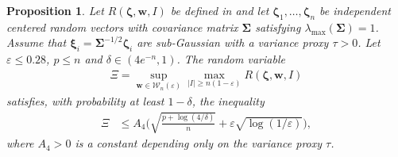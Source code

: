 \documentclass[aos,preprint,reqno]{imsart}
\newcommand\bxi{\boldsymbol\xi}
\newcommand\bzeta{\boldsymbol\zeta}
\newcommand\bSigma{\boldsymbol\Sigma}
\newcommand\bw{\boldsymbol w}
\theoremstyle{plain}
\newtheorem{proposition}{Proposition}
\theoremstyle{remark}
\begin{document}
    \begin{proposition}\label{proposition3}
	Let $R(\bzeta,\bw, I)$ be defined in  and 
	let $\bzeta_1,\ldots,\bzeta_n$ be independent centered random 
	vectors with covariance matrix $\bSigma$ satisfying 
	$\lambda_{\max}(\bSigma) = 1$. Assume that $\bxi_i = 
	\bSigma^{-1/2}\bzeta_i$ are sub-Gaussian with a variance proxy
	$\tau>0$. Let $\varepsilon\le 0.28$, $p\le n$ and $\delta\in 
	(4e^{-n}, 1)$. The random variable 
	\begin{align}
		\Xi = \sup_{\bw\in \mathcal W_n(\varepsilon)} 
		\max_{|I|\ge n(1-\varepsilon)} R(\bzeta,\bw, I)
	\end{align}
	satisfies, with probability at least $1-\delta$, the inequality 
	\begin{align}
		\Xi &\le A_4\bigg(\sqrt{\frac{p + \log(4/\delta)}{n}} + 
		\varepsilon\sqrt{\log(1/\varepsilon)}\bigg), \label{ineq:xi:bis}
	\end{align}
	where $A_4>0$ is a constant depending only on the variance
	proxy $\tau$.
	\end{proposition}
	
\end{document}
